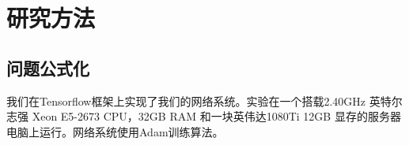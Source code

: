 \documentclass[winfonts]{njuthesis}
\begin{document}
%
%

%





\chapter{研究方法}

\section{问题公式化}
我们在Tensorflow框架上实现了我们的网络系统。实验在一个搭载2.40GHz 英特尔志强 Xeon E5-2673 CPU，32GB RAM 和一块英伟达1080Ti 12GB 显存的服务器电脑上运行。网络系统使用Adam训练算法。
\end{document}
